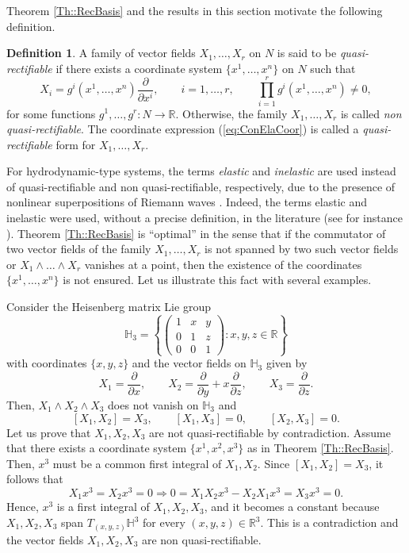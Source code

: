 \documentclass[12pt]{article}
\theoremstyle{plain}
\theoremstyle{definition}
\newtheorem{definition}[theorem]{Definition}
\numberwithin{equation}{section}
\begin{document}
Theorem \ref{Th::RecBasis} and the results in this section motivate the following definition.
\begin{definition} A family of vector fields $X_1,\ldots,X_r$ on $N$ is said to be {\it quasi-rectifiable} if there exists a coordinate system $\{x^1,\ldots,x^n\}$ on $N$ such that
\begin{equation}\label{eq:ConElaCoor}
X_i=g^i(x^1,\ldots,x^n)\frac{\partial}{\partial x^i},\qquad i=1,\ldots,r,\qquad \prod_{i=1}^rg^i(x^1,\ldots,x^n)\neq 0,
\end{equation}
for some functions $g^1,\ldots,g^r:N\rightarrow \mathbb{R}$. 
Otherwise, the family $X_1,\ldots,X_r$ is called {\it non quasi-rectifiable}. The coordinate expression (\ref{eq:ConElaCoor}) is called a {\it quasi-rectifiable} form for $X_1,\ldots,X_r$.
	
\end{definition}

For hydrodynamic-type systems, the terms {\it elastic} and {\it inelastic} are used instead of quasi-rectifiable and non quasi-rectifiable, respectively, due to the presence of nonlinear superpositions of Riemann waves \cite{Pe85}. Indeed, the terms elastic and inelastic were used, without a precise definition, in the literature 
(see for instance \cite[pg. 349]{Pe74}). Theorem \ref{Th::RecBasis} is ``optimal'' in the sense that  if the commutator of  two vector fields of the family $X_1,\ldots,X_r$ is not spanned by two such vector fields or $X_1\wedge \ldots\wedge X_r$ vanishes at a point, then the existence of the coordinates $\{x^1,\ldots,x^n\}$ is not ensured. Let us illustrate this fact with several examples.



Consider the Heisenberg matrix Lie group 
$$
\mathbb{H}_3=\left\{\left(\begin{array}{ccc}1&x&y\\0&1&z\\0&0&1\end{array}\right):x,y,z\in \mathbb{R}\right\}
$$
with coordinates $\{x,y,z\}$ and the vector fields on $\mathbb{H}_3$ given by
$$
X_1=\frac{\partial}{\partial x},\qquad X_2=\frac{\partial}{\partial y}+x\frac{\partial}{\partial z},\qquad X_3=\frac{\partial}{\partial z}.
$$
Then, $X_1\wedge X_2\wedge X_3$ does not vanish on $\mathbb{H}_3$ and 
$$
[X_1,X_2]=X_3,\qquad [X_1,X_3]=0,\qquad [X_2,X_3]=0.
$$
Let us prove that $X_1,X_2,X_3$ are not quasi-rectifiable by contradiction. Assume that there exists a coordinate system $\{x^1,x^2,x^3\}$ as in Theorem \ref{Th::RecBasis}. Then, $x^3$ must be a common first integral of $X_1,X_2$. Since $[X_1,X_2]=X_3$, it follows that
$$
X_1x^3=X_2x^3=0\Rightarrow 0=X_1X_2x^3-X_2X_1x^3=X_3x^3=0.
$$
Hence, $x^3$ is a first integral of $X_1,X_2,X_3$, and it becomes a constant because $X_1,X_2,X_3$ span $T_{(x,y,z)}\mathbb{H}^3$ for every $(x,y,z)\in \mathbb{R}^3$.  This is a contradiction and the vector fields $X_1,X_2,X_3$ are non quasi-rectifiable.
\end{document}
